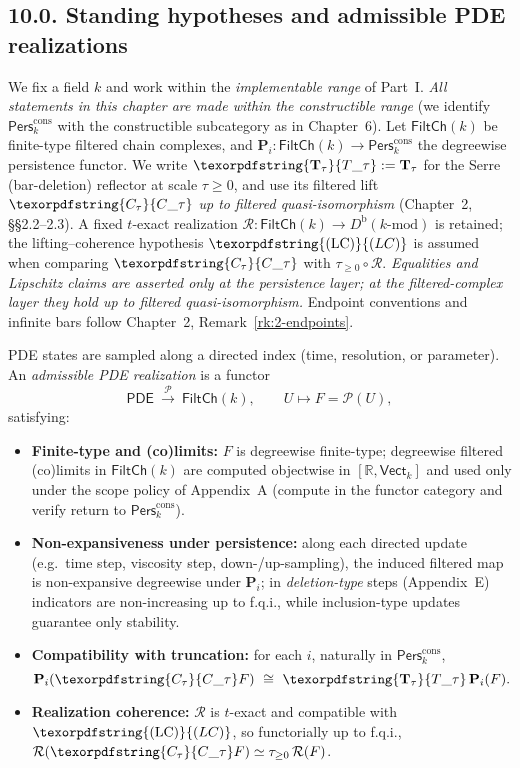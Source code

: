 \documentclass[11pt]{article}
\DeclareRobustCommand{\hyp}{\nobreakdash-}
\newcommand{\Pers}{\mathsf{Pers}}
\newcommand{\Rfun}{\mathcal{R}}
\numberwithin{equation}{section}
\theoremstyle{definition}
\DeclareRobustCommand{\FiltCh}[1]{\mathsf{FiltCh}(#1)}
\DeclareRobustCommand{\Perskft}{\Pers^{\mathrm{cons}}_{k}}
\DeclareRobustCommand{\Ttau}{\texorpdfstring{\ensuremath{\mathbf{T}_{\tau}}}{T\_\tau}}
\DeclareRobustCommand{\Ctau}{\texorpdfstring{\ensuremath{C_{\tau}}}{C\_\tau}}
\DeclareRobustCommand{\LC}{\texorpdfstring{\ensuremath{\mathrm{(LC)}}}{(LC)}}
\begin{document}
\subsection*{10.0. Standing hypotheses and admissible PDE realizations}
We fix a field \(k\) and work within the \emph{implementable range} of Part~I.
\emph{All statements in this chapter are made within the constructible range}
(we identify \(\Perskft\) with the constructible subcategory as in Chapter~6).
Let \(\FiltCh{k}\) be finite\hyp type filtered chain complexes, and \(\mathbf{P}_i:\FiltCh{k}\to\Perskft\) the degreewise persistence functor.
We write \(\Ttau:=\mathbf{T}_\tau\) for the Serre (bar\hyp deletion) reflector at scale \(\tau\ge 0\), and use its filtered lift \(\Ctau\) \emph{up to filtered quasi\hyp isomorphism} (Chapter~2, §§2.2–2.3).
A fixed \(t\)\hyp exact realization \(\Rfun:\FiltCh{k}\to D^{\mathrm{b}}(k\text{-mod})\) is retained; the lifting–coherence hypothesis \(\LC\) is assumed when comparing \(\Ctau\) with \(\tau_{\ge 0}\!\circ\!\Rfun\).
\emph{Equalities and Lipschitz claims are asserted only at the persistence layer; at the filtered\hyp complex layer they hold up to filtered quasi\hyp isomorphism.}
Endpoint conventions and infinite bars follow Chapter~2, Remark~\ref{rk:2-endpoints}.

PDE states are sampled along a directed index (time, resolution, or parameter). An \emph{admissible PDE realization} is a functor
\[
  \mathsf{PDE}\ \xrightarrow{\ \mathcal{P}\ }\ \FiltCh{k},\qquad U\longmapsto F=\mathcal{P}(U),
\]
satisfying:
\begin{itemize}
  \item \textbf{Finite\hyp type and (co)limits:} \(F\) is degreewise finite\hyp type; degreewise filtered (co)limits in \(\FiltCh{k}\) are computed objectwise in \([\mathbb{R},\mathsf{Vect}_k]\) and used only under the scope policy of Appendix~A (compute in the functor category and verify return to \(\Pers^{\mathrm{cons}}_k\)).
  \item \textbf{Non\hyp expansiveness under persistence:} along each directed update (e.g.\ time step, viscosity step, down\hyp /up\hyp sampling), the induced filtered map is non\hyp expansive degreewise under \(\mathbf{P}_i\);
  in \emph{deletion\hyp type} steps (Appendix~E) indicators are non\hyp increasing up to f.q.i., while inclusion\hyp type updates guarantee only stability.
  \item \textbf{Compatibility with truncation:} for each \(i\), naturally in \(\Perskft\),
  \[
    \mathbf{P}_i(\Ctau F)\ \cong\ \Ttau\,\mathbf{P}_i(F).
  \]
  \item \textbf{Realization coherence:} \(\Rfun\) is \(t\)\hyp exact and compatible with \(\LC\), so functorially up to f.q.i.,
  \(\Rfun(\Ctau F)\simeq \tau_{\ge 0}\,\Rfun(F)\).
\end{itemize}
\end{document}

